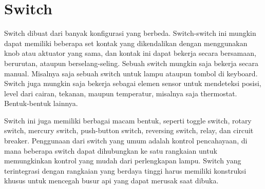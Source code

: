 \section{Switch}
\label{sec:switch}

Switch dibuat dari banyak konfigurasi yang berbeda. Switch-switch ini mungkin dapat memiliki beberapa set kontak yang dikendalikan dengan menggunakan knob atau aktuator yang sama, dan kontak ini dapat bekerja secara bersamaan, berurutan, ataupun berselang-seling. Sebuah switch mungkin saja bekerja secara manual. Misalnya saja sebuah switch untuk lampu ataupun tombol di keyboard. Switch juga mungkin saja bekerja sebagai elemen sensor untuk mendeteksi posisi, level dari cairan, tekanan, maupun temperatur, misalnya saja thermostat. Bentuk-bentuk lainnya.

Switch ini juga memiliki berbagai macam bentuk, seperti toggle switch, rotary switch, mercury switch, push-button switch, reversing switch, relay, dan circuit breaker. Penggunaan dari switch yang umum adalah kontrol pencahayaan, di mana beberapa switch dapat dihubungkan ke satu rangkaian untuk memungkinkan kontrol yang mudah dari perlengkapan lampu. Switch yang terintegrasi dengan rangkaian yang berdaya tinggi harus memiliki konstruksi khusus untuk mencegah busur api yang dapat merusak saat dibuka.
